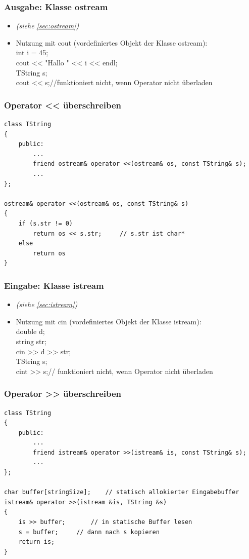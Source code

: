 \subsubsection{Ausgabe: Klasse ostream}
\begin{itemize}
	\item \emph{(siehe \ref{sec:ostream})}
	\item Nutzung mit cout (vordefiniertes Objekt der Klasse ostream):\\
	int i = 45;\\
	cout << "Hallo " << i << endl;\\
	TString s;\\
	\color{red}cout << s;\qquad//funktioniert nicht, wenn Operator nicht überladen \color{black}
\end{itemize}

\subsubsection{Operator << überschreiben}
\noindent
\begin{minipage}{\linewidth}
\begin{lstlisting}
class TString
{
	public:
		...
		friend ostream& operator <<(ostream& os, const TString& s);
		...
};

ostream& operator <<(ostream& os, const TString& s)
{
	if (s.str != 0)
		return os << s.str;		// s.str ist char*
	else
		return os
}
\end{lstlisting}
\end{minipage}

\subsubsection{Eingabe: Klasse istream}
\begin{itemize}
	\item \emph{(siehe \ref{sec:istream})}
	\item Nutzung mit cin (vordefiniertes Objekt der Klasse istream):\\
	double d;\\
	string str;\\
	cin >> d >> str;\\
	TString s;\\
	\color{red}cint >> s;\qquad// funktioniert nicht, wenn Operator nicht überladen \color{black}
\end{itemize}

\subsubsection{Operator >> überschreiben}
\noindent
\begin{minipage}{\linewidth}
\begin{lstlisting}
class TString
{
	public:
		...
		friend istream& operator >>(istream& is, const TString& s);
		...
};

char buffer[stringSize];	// statisch allokierter Eingabebuffer
istream& operator >>(istream &is, TString &s)
{
	is >> buffer;		// in statische Buffer lesen
	s = buffer;		// dann nach s kopieren
	return is;
}
\end{lstlisting}
\end{minipage}